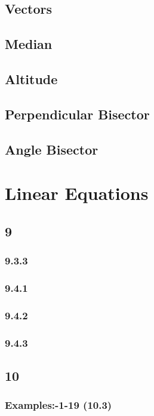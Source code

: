 \documentclass[11pt]{book}
\begin{document}
\section{Vectors}

\section{Median}

\section{Altitude}

\section{Perpendicular Bisector}

\section{Angle Bisector}

%
\chapter{Linear Equations}
\section{9}
\subsection{9.3.3}

\subsection{9.4.1}

\subsection{9.4.2}

\subsection{9.4.3}

\section{10}
\subsection{Examples:-1-19 (10.3)}

\end{document}
